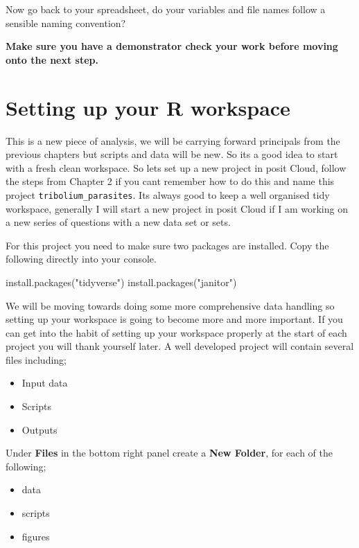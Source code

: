 \documentclass[
]{book}
\newenvironment{Shaded}{\begin{snugshade}}{\end{snugshade}}
\newcommand{\FunctionTok}[1]{\textcolor[rgb]{0.00,0.00,0.00}{#1}}
\newcommand{\NormalTok}[1]{#1}
\newcommand{\StringTok}[1]{\textcolor[rgb]{0.31,0.60,0.02}{#1}}
\providecommand{\tightlist}{%
  \setlength{\itemsep}{0pt}\setlength{\parskip}{0pt}}
\begin{document}
Now go back to your spreadsheet, do your variables and file names follow a sensible naming convention?

\textbf{Make sure you have a demonstrator check your work before moving onto the next step.}

\hypertarget{workspace}{%
\section{Setting up your R workspace}\label{workspace}}

This is a new piece of analysis, we will be carrying forward principals from the previous chapters but scripts and data will be new. So its a good idea to start with a fresh clean workspace. So lets set up a new project in posit Cloud, follow the steps from Chapter 2 if you cant remember how to do this and name this project \texttt{tribolium\_parasites}. Its always good to keep a well organised tidy workspace, generally I will start a new project in posit Cloud if I am working on a new series of questions with a new data set or sets.

For this project you need to make sure two packages are installed. Copy the following directly into your console.

\begin{Shaded}
\begin{Highlighting}[]
\FunctionTok{install.packages}\NormalTok{(}\StringTok{"tidyverse"}\NormalTok{)}
\FunctionTok{install.packages}\NormalTok{(}\StringTok{"janitor"}\NormalTok{)}
\end{Highlighting}
\end{Shaded}

We will be moving towards doing some more comprehensive data handling so setting up your workspace is going to become more and more important. If you can get into the habit of setting up your workspace properly at the start of each project you will thank yourself later. A well developed project will contain several files including;

\begin{itemize}
\tightlist
\item
  Input data
\item
  Scripts
\item
  Outputs
\end{itemize}

Under \textbf{Files} in the bottom right panel create a \textbf{New Folder}, for each of the following;

\begin{itemize}
\tightlist
\item
  data
\item
  scripts
\item
  figures
\end{itemize}
\end{document}
